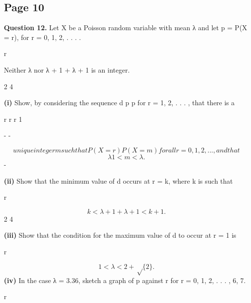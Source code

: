 \documentclass[12pt]{article}
\begin{document}
\subsection*{Page 10}
\begin{flushleft}
\bigskip\textbf{Question 12.} Let X be a Poisson random variable with mean λ and let p = P(X = r), for r = 0, 1, 2, . . . .\par
r\par
Neither λ nor λ + 1 + λ + 1 is an integer.\par
2 4\par
\textbf{(i)} Show, by considering the sequence d p p for r = 1, 2, . . . , that there is a\par
r r r 1\par
\equiv - -\par
\[unique integer m such that P(X = r)  P(X = m) for all r = 0, 1, 2, . . . , and that\]
\[λ 1 < m < λ.\]
-\par
\textbf{(ii)} Show that the minimum value of d occurs at r = k, where k is such that\par
r\par
\[k < λ + 1 + λ + 1 < k + 1.\]
2 4\par
\textbf{(iii)} Show that the condition for the maximum value of d to occur at r = 1 is\par
r\par
\[1 < λ < 2 + \sqrt\{2\}.\]
\textbf{(iv)} In the case λ = 3.36, sketch a graph of p against r for r = 0, 1, 2, . . . , 6, 7.\par
r\par
\end{flushleft}
\end{document}
